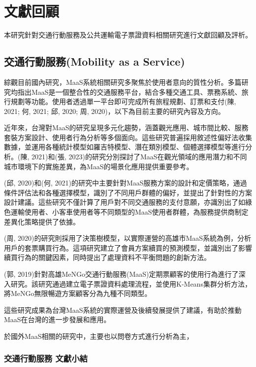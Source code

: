 \chapter{文獻回顧}\label{ux6587ux737bux56deux9867}

本研究針對交通行動服務及公共運輸電子票證資料相關研究進行文獻回顧及評析。

\section{交通行動服務(Mobility as a
Service)}\label{ux4ea4ux901aux884cux52d5ux670dux52d9mobility-as-a-service}

綜觀目前國內研究，MaaS系統相關研究多聚焦於使用者意向的質性分析。多篇研究均指出MaaS是一個整合性的交通服務平台，結合多種交通工具、票務系統、旅行規劃等功能。使用者透過單一平台即可完成所有旅程規劃、訂票和支付(陳,
2021; 何, 2021; 邱, 2020; 周, 2020)，以下為目前主要的研究內容及方向。

近年來，台灣對MaaS的研究呈現多元化趨勢，涵蓋觀光應用、城市間比較、服務套裝方案設計、使用者行為分析等多個面向。這些研究普遍採用敘述性偏好法收集數據，並運用各種統計模型如羅吉特模型、潛在類別模型、個體選擇模型等進行分析。(陳,
2021)和(張,
2023)的研究分別探討了MaaS在觀光領域的應用潛力和不同城市環境下的實施差異，為MaaS的場景化應用提供重要參考。

(邱, 2020)和(何,
2021)的研究中主要針對MaaS服務方案的設計和定價策略，通過條件評估法和各種選擇模型，識別了不同用戶群體的偏好，並提出了針對性的方案設計建議。這些研究不僅計算了用戶對不同交通服務的支付意願，亦識別出了如綠色運輸使用者、小客車使用者等不同類型的MaaS使用者群體，為服務提供商制定差異化策略提供了依據。

(周,
2020)的研究則採用了決策樹模型，以實際運營的高雄市MaaS系統為例，分析用戶的套票購買行為。這項研究建立了會員方案續買的預測模型，並識別出了影響續買行為的關鍵因素，同時提出了處理資料不平衡問題的創新方法。

(郭,
2019)針對高雄MeNGo交通行動服務(MaaS)定期票顧客的使用行為進行了深入研究。該研究通過建立電子票證資料處理流程，並使用K-Means集群分析方法，將MeNGo無限暢遊方案顧客分為九種不同類型。

這些研究成果為台灣MaaS系統的實際運營及後續發展提供了建議，有助於推動MaaS在台灣的進一步發展和應用。

於國外MaaS相關的研究中，主要也以問卷方式進行分析為主，

\subsection{交通行動服務
文獻小結}\label{ux4ea4ux901aux884cux52d5ux670dux52d9-ux6587ux737bux5c0fux7d50}

